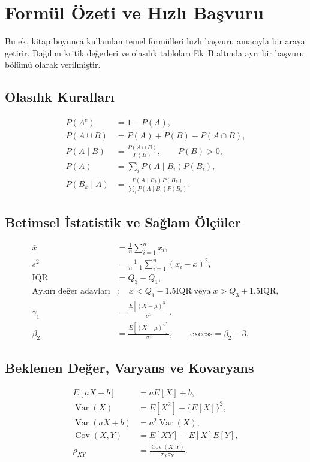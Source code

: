 \chapter{Formül Özeti ve Hızlı Başvuru}
Bu ek, kitap boyunca kullanılan temel formülleri hızlı başvuru amacıyla bir araya getirir. Dağılım kritik değerleri ve olasılık tabloları Ek~B altında ayrı bir başvuru bölümü olarak verilmiştir.


\section{Olasılık Kuralları}
\begin{align*}
P(A^c) &= 1-P(A), \\
P(A\cup B) &= P(A)+P(B)-P(A\cap B), \\
P(A\mid B) &= \frac{P(A\cap B)}{P(B)}, \qquad P(B)>0, \\
P(A) &= \sum_i P(A\mid B_i)P(B_i), \\
P(B_k\mid A) &= \frac{P(A\mid B_k)P(B_k)}{\sum_i P(A\mid B_i)P(B_i)}.
\end{align*}


\section{Betimsel İstatistik ve Sağlam Ölçüler}
\begin{align*}
\bar{x} &= \frac{1}{n}\sum_{i=1}^{n}x_i, \\
s^2 &= \frac{1}{n-1}\sum_{i=1}^{n}(x_i-\bar{x})^2, \\
\mathrm{IQR} &= Q_3-Q_1, \\
\text{Aykırı değer adayları} &: \quad x<Q_1-1.5\mathrm{IQR}\; \text{veya}\; x>Q_3+1.5\mathrm{IQR}, \\
\gamma_1 &= \frac{E[(X-\mu)^3]}{\sigma^3}, \\
\beta_2 &= \frac{E[(X-\mu)^4]}{\sigma^4}, \qquad \text{excess}=\beta_2-3.
\end{align*}

\section{Beklenen Değer, Varyans ve Kovaryans}
\begin{align*}
E[aX+b] &= aE[X]+b, \\
\operatorname{Var}(X) &= E[X^2]-\{E[X]\}^2, \\
\operatorname{Var}(aX+b) &= a^2\operatorname{Var}(X), \\
\operatorname{Cov}(X,Y) &= E[XY]-E[X]E[Y], \\
\rho_{XY} &= \frac{\operatorname{Cov}(X,Y)}{\sigma_X\sigma_Y}.
\end{align*}


